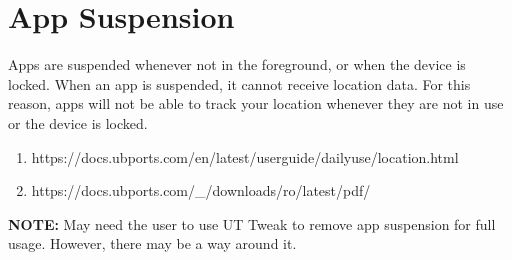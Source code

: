 \section{App Suspension}


Apps are suspended whenever not in the foreground, or when the device is locked. When an app is suspended, it cannot receive location data. For this reason, apps will not be able to track your location whenever they are not in use or the device is locked.

\begin{enumerate}
	\item https://docs.ubports.com/en/latest/userguide/dailyuse/location.html
	\item https://docs.ubports.com/\_/downloads/ro/latest/pdf/
\end{enumerate}

\textbf{NOTE:} May need the user to use UT Tweak to remove app suspension for full usage.
However, there may be a way around it.